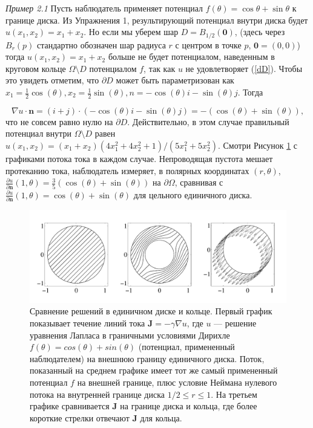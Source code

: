 \documentclass[a4paper, 12pt]{article}
\begin{document}
\textit{Пример 2.1} Пусть наблюдатель применяет потенциал $f(\theta) = \cos \theta + 
\sin \theta$ к границе
диска. Из Упражнения 1, результирующий потенциал внутри диска будет $u(x_1, x_2) = x_1 
+ x_2$. Но если мы
уберем шар $D = B_{1/2}(\textbf{0})$, (здесь через $B_{r}(p)$
стандартно обозначен шар радиуса $r$ с центром в точке $p$, $\textbf{0} = (0, 0)$) 
тогда $u(x_1, x_2) = x_1 + x_2$ больше не будет потенциалом, наведенным в круговом 
кольце $\Omega \setminus D$ потенциалом $f$, так
как $u$ не удовлетворяет (\ref{dD}). Чтобы это увидеть отметим, что $\partial D$ может 
быть параметризован как $x_1 = \frac{1}{2} \cos (\theta), x_2 = \frac{1}{2} \sin 
(\theta), n = -\cos (\theta) i - \sin (\theta) j$. Тогда

\begin{equation*}
\nabla u \cdot \textbf{n} = (i + j) \cdot (-\cos (\theta) i - \sin (\theta) j) =
-(\cos(\theta)+\sin(\theta)),
\end{equation*}
что не совсем равно нулю на $\partial D$. Действительно, в этом случае
правильный потенциал внутри $\Omega \setminus D$ равен $u(x_1, x_2) =
(x_1 + x_2)(4x_1^2 + 4x_2^2 + 1)/(5x_1^2 + 5x_2^2)$. Смотри Рисунок
\ref{fig:3} с графиками потока тока в каждом случае. Непроводящая
пустота мешает протеканию тока, наблюдатель измеряет, в полярных
координатах $(r, \theta)$, $\frac{\partial u}{\partial \textbf{n}}(1,
\theta) = \frac{3}{5}(\cos(\theta)+\sin(\theta))$ на $\partial
\Omega$, сравнивая с $\frac{\partial u}{\partial \textbf{n}}(1,
\theta) = \cos(\theta)+\sin(\theta)$ для цельного единичного диска.
\begin{figure}[t]
  \centering
  \includegraphics[height=0.15\paperheight]{3.png}
  \caption{Сравнение решений в единичном диске и кольце. Первый график показывает 
  течение линий тока $\mathbf J = -\gamma \nabla u$, где $u$ --- решение уравнения 
Лапласа в граничными условиями Дирихле $f(\theta) =
    cos(\theta) + sin(\theta)$ (потенциал, примененный наблюдателем) на внешнюю 
 границу единичного диска.
Поток, показанный на среднем графике имеет тот же самый примененный потенциал  $f$ на 
внешней границе, плюс условие Неймана нулевого потока на внутренней границе диска
    $1/2 \leq r \leq 1$. На третьем графике сравнивается $\mathbf J$ на границе диска 
и кольца, где более короткие стрелки отвечают  $\mathbf J$ для кольца.}
  \label{fig:3}
\end{figure}
\end{document}
